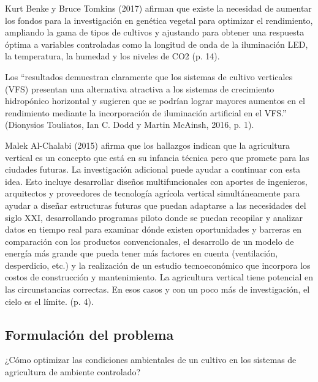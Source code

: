 \documentclass{report}
\begin{document}
Kurt Benke y Bruce Tomkins (2017) afirman que existe la necesidad de aumentar
los fondos para la investigación en genética vegetal para optimizar el
rendimiento, ampliando la gama de tipos de cultivos y ajustando para obtener una
respuesta óptima a variables controladas como la longitud de onda de la
iluminación LED, la temperatura, la humedad y los niveles de CO2 (p. 14).

Los ``resultados demuestran claramente que los sistemas de cultivo
verticales (VFS) presentan una alternativa atractiva a los sistemas de
crecimiento hidropónico horizontal y sugieren que se podrían lograr mayores
aumentos en el rendimiento mediante la incorporación de iluminación artificial
en el VFS.'' (Dionysios Touliatos, Ian C. Dodd y Martin McAinsh, 2016, p. 1).

Malek Al-Chalabi (2015) afirma que los hallazgos indican que la agricultura
vertical es un concepto que está en su infancia técnica pero que promete para
las ciudades futuras. La investigación adicional puede ayudar a continuar con
esta idea. Esto incluye desarrollar diseños multifuncionales con aportes de
ingenieros, arquitectos y proveedores de tecnología agrícola vertical
simultáneamente para ayudar a diseñar estructuras futuras que puedan adaptarse a
las necesidades del siglo XXI, desarrollando programas piloto donde se puedan
recopilar y analizar datos en tiempo real para examinar dónde existen
oportunidades y barreras en comparación con los productos convencionales, el
desarrollo de un modelo de energía más grande que pueda tener más factores en
cuenta (ventilación, desperdicio, etc.) y la realización de un estudio
tecnoeconómico que incorpora los costos de construcción y mantenimiento.
La agricultura vertical tiene potencial en las circunstancias correctas. En esos
casos y con un poco más de investigación, el cielo es el límite. (p. 4).
\subsection{Formulación del problema}
¿Cómo optimizar las condiciones ambientales de un cultivo en los sistemas de
agricultura de ambiente controlado?
\end{document}

